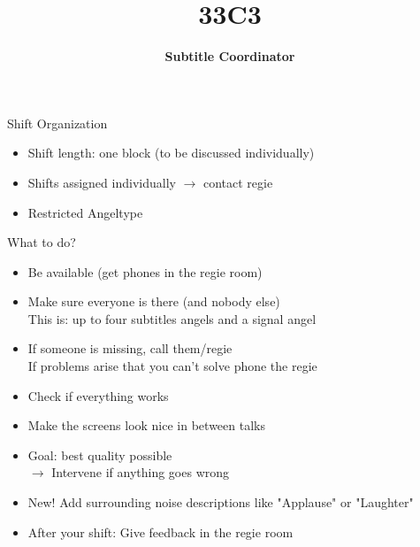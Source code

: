 \documentclass[utf8,widescreen]{beamer}
\title{\Huge \textbf{33C3}}
\subtitle{{\Large \textbf{Subtitle Coordinator}}\\}
\date{}
\begin{document}
\begin{frame}{\titlepage}
\end{frame}

\begin{frame}{Shift Organization}
\pause
\begin{block}{}
\begin{itemize}\itemsep 14pt
\item{Shift length: one block (to be discussed individually)}
\pause
\item{Shifts assigned individually $\rightarrow$ contact regie}
\pause
\item{Restricted Angeltype}
\end{itemize}
\end{block}
\end{frame}

\begin{frame}{What to do?}
\pause
\begin{block}{}
\begin{itemize}\itemsep 10pt
\item{Be available (get phones in the regie room)}
\pause
\item{Make sure everyone is there (and nobody else)\\
This is: up to four subtitles angels and a signal angel}
\pause
\item{If someone is missing, call them/regie\\
If problems arise that you can't solve phone the regie}
\pause
\item{Check if everything works}
\pause
\item{Make the screens look nice in between talks}
\pause
\item{Goal: best quality possible\\
\pause
$\rightarrow$ Intervene if anything goes wrong}
\pause
\item{{\color{red}New!} Add surrounding noise descriptions like "Applause" or "Laughter"}
\pause
\item{After your shift: Give feedback in the regie room}
\end{itemize}
\end{block}
\end{frame}
\end{document}
